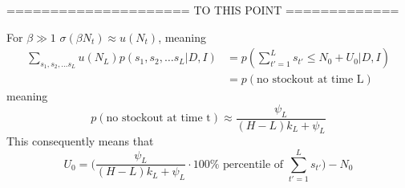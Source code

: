 ===================== TO THIS POINT =============

For $\beta \gg 1$ $\sigma(\beta N_t)\approx u(N_t)$, meaning
\begin{equation}
	\begin{split}
		\sum_{s_1,s_2,\dots s_L}u(N_L)
		p(s_{1},s_{2},\dots s_{L}|D,I) & = p(\sum_{t'=1}^Ls_{t'} \leq N_0+U_{0}|D,I)\\
		& = p(\text{no stockout at time L})
	\end{split}
\end{equation}
meaning
\begin{equation}
	p(\text{no stockout at time t})\approx\frac{\psi_{L}}{(H-L)k_{L}+\psi_{L}}
	\label{eq:d_rule1}
\end{equation}
This consequently means that
\begin{equation}
	U_0 = \bigg(\frac{\psi_{L}}{(H-L)k_{L}+\psi_{L}}\cdot 100 \% \text{ percentile of } \sum_{t'=1}^L s_{t'}\bigg)- N_0
	\label{eq:dec_rule}
\end{equation}


